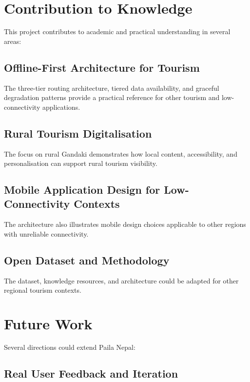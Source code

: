 \documentclass[12pt,a4paper,oneside]{report}
\begin{document}
\section{Contribution to Knowledge}
\label{sec:contribution}

This project contributes to academic and practical understanding in several areas:

\subsection{Offline-First Architecture for Tourism}

The three-tier routing architecture, tiered data availability, and graceful degradation patterns provide a practical reference for other tourism and low-connectivity applications.

\subsection{Rural Tourism Digitalisation}

The focus on rural Gandaki demonstrates how local content, accessibility, and personalisation can support rural tourism visibility.

\subsection{Mobile Application Design for Low-Connectivity Contexts}

The architecture also illustrates mobile design choices applicable to other regions with unreliable connectivity.

\subsection{Open Dataset and Methodology}

The dataset, knowledge resources, and architecture could be adapted for other regional tourism contexts.

\section{Future Work}
\label{sec:future}

Several directions could extend Paila Nepal:

\subsection{Real User Feedback and Iteration}
\end{document}
